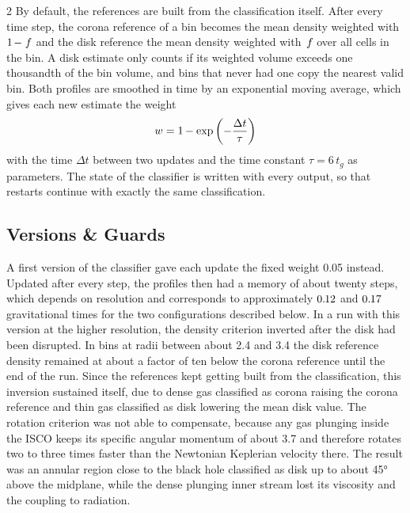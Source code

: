 \begin{multicols}{2}
	By default, the references are built from the classification itself. After every time step, the corona reference of a bin
	becomes the mean density weighted with $1\kern-1pt - \kern+0.5ptf$ and the disk reference the mean density weighted with
	$\kern+1pt f \kern-0.5pt$ over all cells in the bin. A disk estimate only counts if its weighted volume exceeds one thousandth
	of the bin volume, and bins that never had one copy the nearest valid bin. Both profiles are smoothed in time by an exponential
	moving average, which gives each new estimate the weight
	\begin{equation}
		w = 1\kern-0.5pt - \exp\left(-\frac{\Delta t}{\tau}\right)
		\label{eq:ema}
	\end{equation}
	with the time $\Delta t$ between two updates and the time constant $\tau = 6 \, t_g$ as parameters. The state of the
	classifier is written with every output, so that restarts continue with exactly the same classification.

	\subsection{Versions \& Guards}

	A first version of the classifier gave each update the fixed weight \num{0.05} instead. Updated after every step, the
	profiles then had a memory of about twenty steps, which depends on resolution and corresponds to approximately $0.{\kern-0.5pt}12$ and
	$0.{\kern-0.5pt}17$ gravitational times for the two configurations described below. In a run with this version at the higher
	resolution, the density criterion inverted after the disk had been disrupted. In bins at radii between about \num{2.4} and \num{3.4} the
	disk reference density remained at about a factor of ten below the corona reference until the end of the run. Since the references kept
	getting built from the classification, this inversion sustained itself, due to dense gas classified as corona raising the corona reference
	and thin gas classified as disk lowering the mean disk value. The rotation criterion was not able to compensate, because any gas plunging
	inside the ISCO keeps its specific angular momentum of about \num{3.7} and therefore rotates two to three times faster than
	the Newtonian Keplerian velocity there. The result was an annular region close to the black hole classified as disk up to about \ang{45}
	above the midplane, while the dense plunging inner stream lost its viscosity and the coupling to radiation.


\end{multicols}
